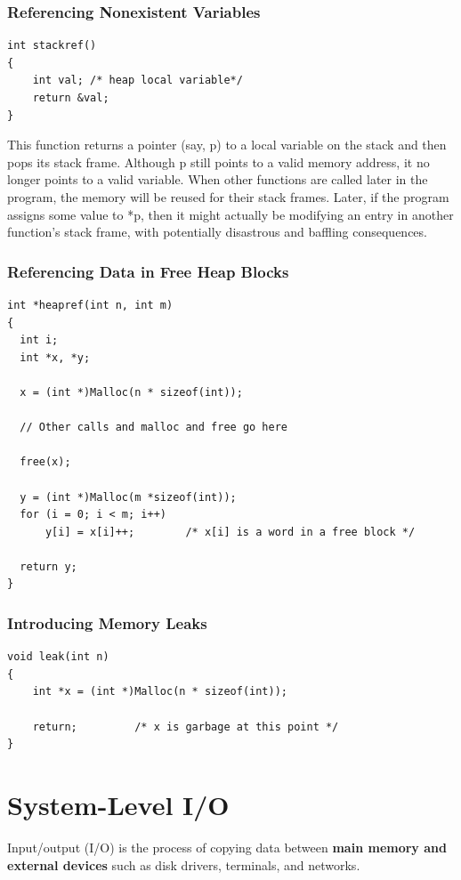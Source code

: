 \documentclass[11pt]{article}
\begin{document}
\subsubsection{Referencing Nonexistent Variables}
\label{sec:orge9da191}
\begin{verbatim}
int stackref()
{
    int val; /* heap local variable*/
    return &val;
}

\end{verbatim}

This function returns a pointer (say, p) to a local variable on the stack and then pops its stack frame. Although p still points to a valid memory address, it no longer points to a valid variable. When other functions are called later in the program, the memory will be reused for their stack frames. Later, if the program assigns some value to *p, then it might actually be modifying an entry in another function’s stack frame, with potentially disastrous and baffling consequences.\\



\subsubsection{Referencing Data in Free Heap Blocks}
\label{sec:orge9b726d}
\begin{verbatim}
int *heapref(int n, int m)
{
  int i;
  int *x, *y;

  x = (int *)Malloc(n * sizeof(int));

  // Other calls and malloc and free go here

  free(x);

  y = (int *)Malloc(m *sizeof(int));
  for (i = 0; i < m; i++)
      y[i] = x[i]++;		/* x[i] is a word in a free block */

  return y;
}

\end{verbatim}

\subsubsection{Introducing Memory Leaks}
\label{sec:org4d19c2d}
\begin{verbatim}
void leak(int n)
{
    int *x = (int *)Malloc(n * sizeof(int));

    return;			/* x is garbage at this point */
}

\end{verbatim}

\section{System-Level I/O}
\label{sec:org5eee1ec}
Input/output (I/O) is the process of copying data between \textbf{main memory and external devices} such as disk drivers, terminals, and networks.\\
\end{document}
